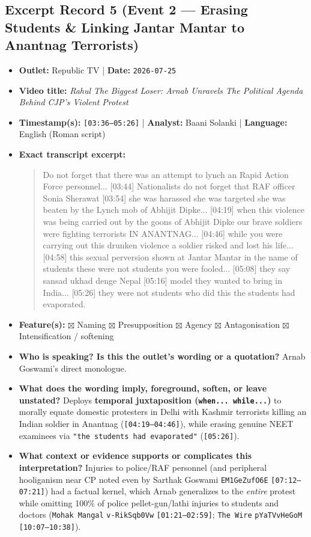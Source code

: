 \documentclass[10pt,a4paper]{article}
\begin{document}
\subsection*{Excerpt Record 5 (Event 2 --- Erasing Students \& Linking Jantar Mantar to Anantnag Terrorists)}
\begin{itemize}[leftmargin=1.5em, itemsep=3pt, topsep=4pt]
  \item \textbf{Outlet:} Republic TV | \textbf{Date:} \texttt{2026-07-25}
  \item \textbf{Video title:} \textit{Rahul The Biggest Loser: Arnab Unravels The Political Agenda Behind CJP's Violent Protest}
  \item \textbf{Timestamp(s):} \texttt{[03:36--05:26]} | \textbf{Analyst:} Baani Solanki | \textbf{Language:} English (Roman script)
  \item \textbf{Exact transcript excerpt:}
    \begin{quote}\small\ttfamily [03:36] Do not forget that there was an attempt to lynch an Rapid Action Force personnel... [03:44] Nationalists do not forget that RAF officer Sonia Sherawat [03:54] she was harassed she was targeted she was beaten by the Lynch mob of Abhijit Dipke... [04:19] when this violence was being carried out by the goons of Abhijit Dipke our brave soldiers were fighting terrorists IN ANANTNAG... [04:46] while you were carrying out this drunken violence a soldier risked and lost his life... [04:58] this sexual perversion shown at Jantar Mantar in the name of students these were not students you were fooled... [05:08] they say sansad ukhad denge Nepal [05:16] model they wanted to bring in India... [05:26] they were not students who did this the students had evaporated.\end{quote}
  \item \textbf{Feature(s):} $\boxtimes$ Naming $\boxtimes$ Presupposition $\boxtimes$ Agency $\boxtimes$ Antagonisation $\boxtimes$ Intensification / softening
  \item \textbf{Who is speaking? Is this the outlet's wording or a quotation?} Arnab Goswami's direct monologue.
  \item \textbf{What does the wording imply, foreground, soften, or leave unstated?} Deploys \textbf{temporal juxtaposition (\texttt{when... while...})} to morally equate domestic protesters in Delhi with Kashmir terrorists killing an Indian soldier in Anantnag (\texttt{[04:19--04:46]}), while erasing genuine NEET examinees via \texttt{"the students had evaporated"} (\texttt{[05:26]}).
  \item \textbf{What context or evidence supports or complicates this interpretation?} Injuries to police/RAF personnel (and peripheral hooliganism near CP noted even by Sarthak Goswami \texttt{EM1GeZufO6E} \texttt{[07:12--07:21]}) had a factual kernel, which Arnab generalizes to the \textit{entire} protest while omitting 100\% of police pellet-gun/lathi injuries to students and doctors (\texttt{Mohak Mangal} \texttt{v-RikSqb0Vw} \texttt{[01:21--02:59]}; \texttt{The Wire} \texttt{pYaTVvHeGoM} \texttt{[10:07--10:38]}).

\end{itemize}
\end{document}
